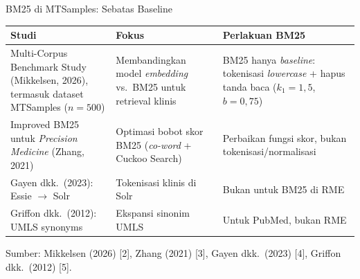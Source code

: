 \documentclass[aspectratio=169,10pt]{beamer}
\newcommand{\source}[1]{\vfill{\scriptsize\raggedright\color{ugmBlueMid}#1\par}\vspace*{0.42cm}}
\begin{document}
\begin{frame}{BM25 di MTSamples: Sebatas Baseline}
  \scriptsize
  \renewcommand{\arraystretch}{1.25}
  \begin{tabular}{|>{\raggedright\arraybackslash}p{}|>{\raggedright\arraybackslash}p{}|>{\raggedright\arraybackslash}p{}|}
    \hline
    \textbf{Studi}                                                                         & \textbf{Fokus}                                                          & \textbf{Perlakuan BM25}                                                                                      \\
    \hline
    Multi-Corpus Benchmark Study (Mikkelsen, 2026), termasuk dataset MTSamples ($n{=}500$) & Membandingkan model \textit{embedding} vs.\ BM25 untuk retrieval klinis & BM25 hanya \textit{baseline}: tokenisasi \textit{lowercase} + hapus tanda baca ($k_1{=}1{,}5$, $b{=}0{,}75$) \\
    \hline
    Improved BM25 untuk \textit{Precision Medicine} (Zhang, 2021)                          & Optimasi bobot skor BM25 (\textit{co-word} + Cuckoo Search)             & Perbaikan fungsi skor, bukan tokenisasi/normalisasi                                                          \\
    \hline
    Gayen dkk.\ (2023): Essie $\to$ Solr                                                   & Tokenisasi klinis di Solr                                               & Bukan untuk BM25 di RME                                                                                      \\
    \hline
    Griffon dkk.\ (2012): UMLS synonyms                                                    & Ekspansi sinonim UMLS                                                   & Untuk PubMed, bukan RME                                                                                      \\
    \hline
  \end{tabular}
  \source{Sumber: Mikkelsen (2026) [2], Zhang (2021) [3], Gayen dkk.\ (2023) [4], Griffon dkk.\ (2012) [5].}
\end{frame}
\end{document}
